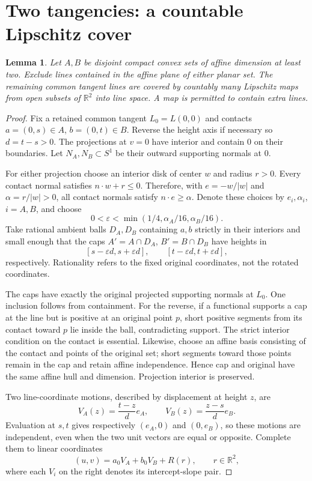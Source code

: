 \documentclass[11pt]{article}
\newcommand{\R}{\mathbb R}
\newcommand{\eps}{\varepsilon}
\newtheorem{lemma}[theorem]{Lemma}
\theoremstyle{remark}
\begin{document}
\section{Two tangencies: a countable Lipschitz cover}
\begin{lemma}\label{lem:charts}
Let $A,B$ be disjoint compact convex sets of affine dimension at least two. Exclude lines contained in the affine plane of either planar set. The remaining common tangent lines are covered by countably many Lipschitz maps from open subsets of $\R^2$ into line space. A map is permitted to contain extra lines.
\end{lemma}
\begin{proof}
Fix a retained common tangent $L_0=L(0,0)$ and contacts $a=(0,s)\in A$, $b=(0,t)\in B$. Reverse the height axis if necessary so $d=t-s>0$. The projections at $v=0$ have interior and contain $0$ on their boundaries. Let $N_A,N_B\subset S^1$ be their outward supporting normals at $0$.

For either projection choose an interior disk of center $w$ and radius $r>0$. Every contact normal satisfies $n\cdot w+r\le0$. Therefore, with $e=-w/|w|$ and $\alpha=r/|w|>0$, all contact normals satisfy $n\cdot e\ge\alpha$. Denote these choices by $e_i,\alpha_i$, $i=A,B$, and choose
\begin{equation}\label{eq:epsilon}
0<\eps<\min(1/4,\alpha_A/16,\alpha_B/16).
\end{equation}
Take rational ambient balls $D_A,D_B$ containing $a,b$ strictly in their interiors and small enough that the caps $A'=A\cap D_A$, $B'=B\cap D_B$ have heights in
\[
[s-\eps d,s+\eps d],\qquad [t-\eps d,t+\eps d],
\]
respectively. Rationality refers to the fixed original coordinates, not the rotated coordinates.

The caps have exactly the original projected supporting normals at $L_0$. One inclusion follows from containment. For the reverse, if a functional supports a cap at the line but is positive at an original point $p$, short positive segments from its contact toward $p$ lie inside the ball, contradicting support. The strict interior condition on the contact is essential. Likewise, choose an affine basis consisting of the contact and points of the original set; short segments toward those points remain in the cap and retain affine independence. Hence cap and original have the same affine hull and dimension. Projection interior is preserved.

Two line-coordinate motions, described by displacement at height $z$, are
\[
V_A(z)=\frac{t-z}{d}e_A,\qquad V_B(z)=\frac{z-s}{d}e_B.
\]
Evaluation at $s,t$ gives respectively $(e_A,0)$ and $(0,e_B)$, so these motions are independent, even when the two unit vectors are equal or opposite. Complete them to linear coordinates
\begin{equation}\label{eq:coordinates}
(u,v)=a_0V_A+b_0V_B+R(r),\qquad r\in\R^2,
\end{equation}
where each $V_i$ on the right denotes its intercept-slope pair.


\end{proof}
\end{document}
